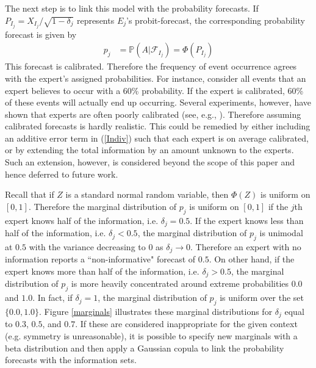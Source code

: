 \documentclass[11pt]{article}
\renewcommand{\P}{\mathbb{P}}
\theoremstyle{definition}
\theoremstyle{definition}
\begin{document}
The next step is to link this model with the probability forecasts. If  $P_{I_j} = X_{I_j}/\sqrt{1-\delta_j}$ represents $E_j$'s probit-forecast, the corresponding probability forecast is given by
\begin{align}
p_j &= \P\left(A | \mathcal{F}_{I_j}\right) = \Phi\left( P_{I_j}\right) \label{Indiv}
\end{align}
This forecast is calibrated. Therefore the frequency of event occurrence agrees with the expert's assigned probabilities. For instance, consider all events that an expert believes to occur with a 60\% probability. If the expert is calibrated, 60\% of these events will actually end up occurring. Several experiments, however, have shown that experts are often poorly calibrated (see, e.g., \cite{cooke1991experts, shlyakhter1994quantifying}). Therefore assuming calibrated forecasts is hardly realistic. This could be remedied by  either including an additive error term in (\ref{Indiv}) such that each expert is on average calibrated, or by extending the total information by an amount unknown to the experts. Such an extension, however, is considered beyond the scope of this paper and hence deferred to future work. 

Recall that if $Z$ is a standard normal random variable, then $\Phi(Z)$ is uniform on $[0,1]$. Therefore the marginal distribution of $p_j$ is uniform on $[0,1]$ if the $j$th expert knows half of the information, i.e. $\delta_j = 0.5$. If the expert knows less than half of the information, i.e. $\delta_j < 0.5$, the marginal distribution of $p_j$ is unimodal at $0.5$ with the variance decreasing to 0 as $\delta_j \to 0$. Therefore an expert with no information reports a ``non-informative" forecast of $0.5$. On other hand, if the expert knows more than half of the information, i.e. $\delta_j > 0.5$, the marginal  distribution of $p_j$ is more heavily concentrated around extreme probabilities $0.0$ and $1.0$. In fact, if $\delta_j = 1$, the marginal distribution of $p_j$ is uniform over the set $\{0.0,1.0\}$. Figure \ref{marginals} illustrates these marginal distributions for $\delta_j$ equal to $0.3$, $0.5$, and $0.7$. If these are considered inappropriate for the given context (e.g. symmetry is  unreasonable), it is possible to specify new marginals with a beta distribution and then apply a Gaussian copula to link the probability forecasts with the information sets. 
\end{document}
